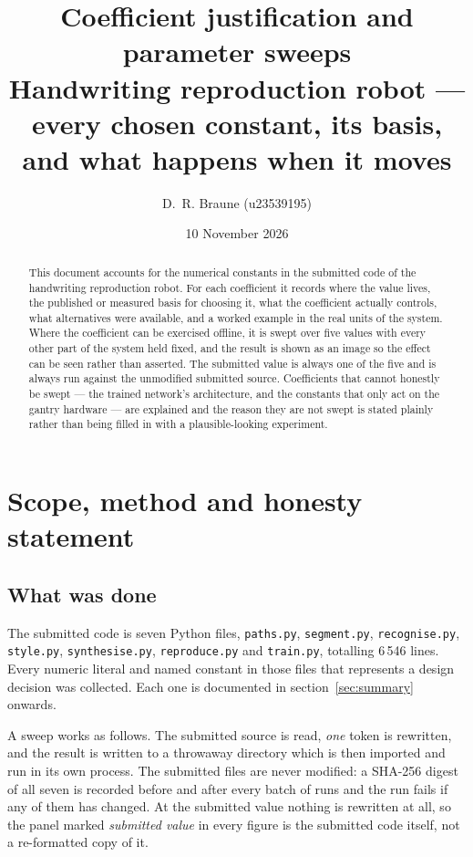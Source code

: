 \documentclass[11pt,a4paper]{article}
\title{Coefficient justification and parameter sweeps\\
\large Handwriting reproduction robot --- every chosen constant,
its basis, and what happens when it moves}
\author{D.~R. Braune (u23539195)}
\date{10 November 2026}
\begin{document}
\maketitle

\begin{abstract}
\noindent
This document accounts for the numerical constants in the submitted code of the
handwriting reproduction robot. For each coefficient it records where the value
lives, the published or measured basis for choosing it, what the coefficient
actually controls, what alternatives were available, and a worked example in the
real units of the system. Where the coefficient can be exercised offline, it is
swept over five values with every other part of the system held fixed, and the
result is shown as an image so the effect can be seen rather than asserted. The
submitted value is always one of the five and is always run against the
unmodified submitted source. Coefficients that cannot honestly be swept --- the
trained network's architecture, and the constants that only act on the gantry
hardware --- are explained and the reason they are not swept is stated plainly
rather than being filled in with a plausible-looking experiment.
\end{abstract}

\tableofcontents
\clearpage

\section{Scope, method and honesty statement}

\subsection{What was done}

The submitted code is seven Python files, \texttt{paths.py},
\texttt{segment.py}, \texttt{recognise.py}, \texttt{style.py},
\texttt{synthesise.py}, \texttt{reproduce.py} and \texttt{train.py}, totalling
6\,546 lines. Every numeric literal and named constant in those files that
represents a design decision was collected. Each one is documented in
section~\ref{sec:summary} onwards.

A sweep works as follows. The submitted source is read, \emph{one} token is
rewritten, and the result is written to a throwaway directory which is then
imported and run in its own process. The submitted files are never modified: a
SHA-256 digest of all seven is recorded before and after every batch of runs and
the run fails if any of them has changed. At the submitted value nothing is
rewritten at all, so the panel marked \emph{submitted value} in every figure is
the submitted code itself, not a re-formatted copy of it.
\end{document}
